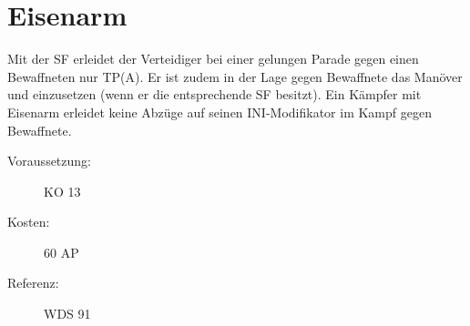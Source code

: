 \section{Eisenarm}
\label{sf.eisenarm}
Mit der SF  erleidet der Verteidiger bei einer gelungen Parade gegen einen Bewaffneten nur TP(A).
Er ist zudem in der Lage gegen Bewaffnete das Manöver  und  einzusetzen (wenn er die entsprechende SF besitzt).
Ein Kämpfer mit Eisenarm erleidet keine Abzüge auf seinen INI-Modifikator im Kampf gegen Bewaffnete.
\begin{description}
    \item[Voraussetzung:]
        KO 13
    \item [Kosten:]
        60 AP
    \item [Referenz:]
        WDS 91
\end{description}
